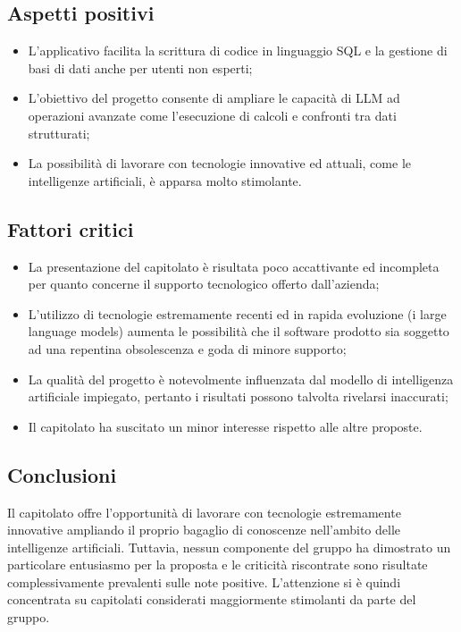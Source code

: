 \documentclass[8pt]{article}
\begin{document}
\subsection{Aspetti positivi}
\begin{itemize}
	\setlength\itemsep{0em}
	\item L'applicativo facilita la scrittura di codice in linguaggio SQL e la gestione di basi di dati anche per utenti non esperti;
	\item L'obiettivo del progetto consente di ampliare le capacità di LLM ad operazioni avanzate come l'esecuzione di calcoli e confronti tra dati strutturati;
	\item La possibilità di lavorare con tecnologie innovative ed attuali, come le intelligenze artificiali, è apparsa molto stimolante.
\end{itemize}

\subsection{Fattori critici}
\begin{itemize}
	\setlength\itemsep{0em}
	\item La presentazione del capitolato è risultata poco accattivante ed incompleta per quanto concerne il supporto tecnologico offerto dall'azienda;
	\item L'utilizzo di tecnologie estremamente recenti ed in rapida evoluzione (i large language models) aumenta le possibilità che il software prodotto sia soggetto ad una repentina obsolescenza e goda di minore supporto;
	\item La qualità del progetto è notevolmente influenzata dal modello di intelligenza artificiale impiegato, pertanto i risultati possono talvolta rivelarsi inaccurati;
	\item Il capitolato ha suscitato un minor interesse rispetto alle altre proposte.
\end{itemize}

\subsection{Conclusioni}
Il capitolato offre l'opportunità di lavorare con tecnologie estremamente innovative ampliando il proprio bagaglio di conoscenze nell'ambito delle intelligenze artificiali. Tuttavia, nessun componente del gruppo ha dimostrato un particolare entusiasmo per la proposta e le criticità riscontrate sono risultate complessivamente prevalenti sulle note positive. L'attenzione si è quindi concentrata su capitolati considerati maggiormente stimolanti da parte del gruppo.
\end{document}
